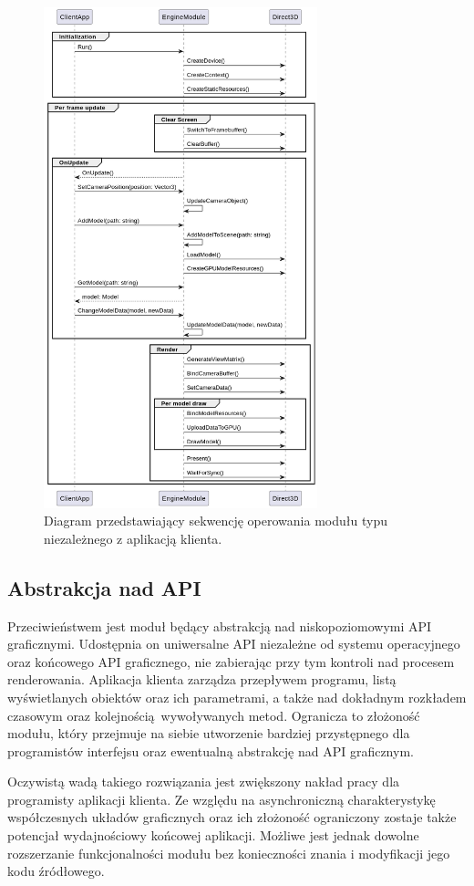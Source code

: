 \begin{figure}[ht!]
	\centering
	\includegraphics[width=300px]{uml/module_type_engine.png}
	\caption{Diagram przedstawiający sekwencję operowania modułu typu niezależnego z aplikacją klienta.}
	\label{UML_Sequence_Module_Engine}
\end{figure}

\vfill
\clearpage

\subsection{Abstrakcja nad API}
\label{Subsection_module_types_abstraction}
Przeciwieństwem jest moduł będący abstrakcją nad niskopoziomowymi API graficznymi. Udostępnia on uniwersalne API niezależne od systemu operacyjnego oraz końcowego API graficznego, nie zabierając przy tym kontroli nad procesem renderowania. Aplikacja klienta zarządza przepływem programu, listą wyświetlanych obiektów oraz ich parametrami, a także nad dokładnym rozkładem czasowym oraz kolejnością wywoływanych metod. Ogranicza to złożoność modułu, który przejmuje na siebie utworzenie bardziej przystępnego dla programistów interfejsu oraz ewentualną abstrakcję nad API graficznym.

Oczywistą wadą takiego rozwiązania jest zwiększony nakład pracy dla programisty aplikacji klienta. Ze względu na asynchroniczną charakterystykę współczesnych układów graficznych oraz ich złożoność ograniczony zostaje także potencjał wydajnościowy końcowej aplikacji. Możliwe jest jednak dowolne rozszerzanie funkcjonalności modułu bez konieczności znania i modyfikacji jego kodu źródłowego.

